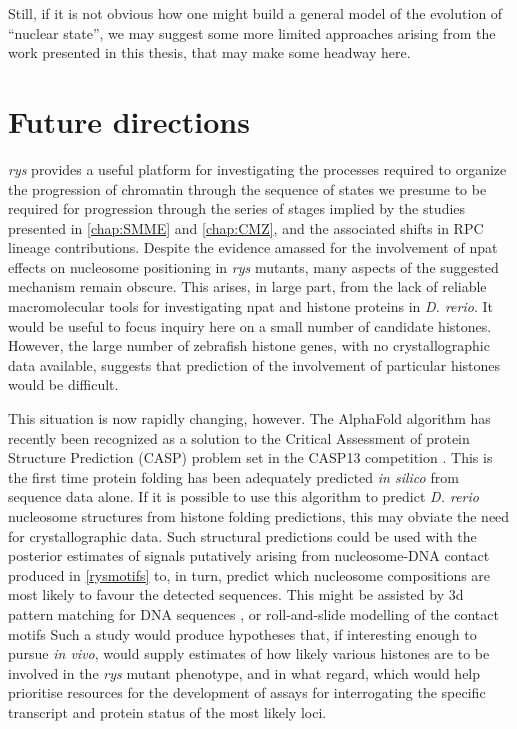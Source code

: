 Still, if it is not obvious how one might build a general model of the evolution of ``nuclear state'', we may suggest some more limited approaches arising from the work presented in this thesis, that may make some headway here.

\section{Future directions}
\textit{rys} provides a useful platform for investigating the processes required to organize the progression of chromatin through the sequence of states we presume to be required for progression through the series of stages implied by the studies presented in \autoref{chap:SMME} and \autoref{chap:CMZ}, and the associated shifts in RPC lineage contributions. Despite the evidence amassed for the involvement of npat effects on nucleosome positioning in \textit{rys} mutants, many aspects of the suggested mechanism remain obscure. This arises, in large part, from the lack of reliable macromolecular tools for investigating npat and histone proteins in \textit{D. rerio}. It would be useful to focus inquiry here on a small number of candidate histones. However, the large number of zebrafish histone genes, with no crystallographic data available, suggests that prediction of the involvement of particular histones would be difficult.

This situation is now rapidly changing, however. The AlphaFold algorithm has recently been recognized as a solution to the Critical Assessment of protein Structure Prediction (CASP) problem set in the CASP13 competition \cite{AlQuraishi2019}. This is the first time protein folding has been adequately predicted \textit{in silico} from sequence data alone. If it is possible to use this algorithm to predict \textit{D. rerio} nucleosome structures from histone folding predictions, this may obviate the need for crystallographic data. Such structural predictions could be used with the posterior estimates of signals putatively arising from nucleosome-DNA contact produced in \autoref{rysmotifs} to, in turn, predict which nucleosome compositions are most likely to favour the detected sequences. This might be assisted by 3d pattern matching for DNA sequences \cite{Herisson2007}, or roll-and-slide modelling of the contact motifs \cite{Tolstorukov2007} Such a study would produce hypotheses that, if interesting enough to pursue \textit{in vivo}, would supply estimates of how likely various histones are to be involved in the \textit{rys} mutant phenotype, and in what regard, which would help prioritise resources for the development of assays for interrogating the specific transcript and protein status of the most likely loci.

